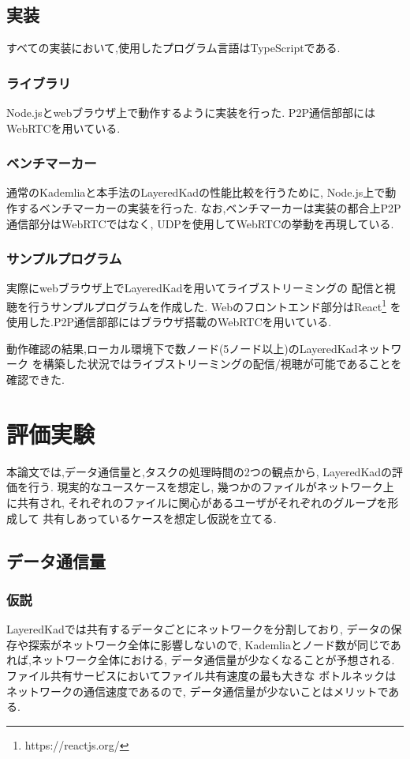 \documentclass[sotsuron]{jcsie}
\begin{document}
\section{実装}
すべての実装において,使用したプログラム言語はTypeScriptである.

\subsection{ライブラリ}
Node.jsとwebブラウザ上で動作するように実装を行った.
P2P通信部部にはWebRTCを用いている.

\subsection{ベンチマーカー}
通常のKademliaと本手法のLayeredKadの性能比較を行うために,
Node.js上で動作するベンチマーカーの実装を行った.
なお,ベンチマーカーは実装の都合上P2P通信部分はWebRTCではなく,
UDPを使用してWebRTCの挙動を再現している.

\subsection{サンプルプログラム}
実際にwebブラウザ上でLayeredKadを用いてライブストリーミングの
配信と視聴を行うサンプルプログラムを作成した.
Webのフロントエンド部分はReact\footnote{https://reactjs.org/}
を使用した.P2P通信部部にはブラウザ搭載のWebRTCを用いている.

動作確認の結果,ローカル環境下で数ノード(5ノード以上)のLayeredKadネットワーク
を構築した状況ではライブストリーミングの配信/視聴が可能であることを
確認できた.

\chapter{評価実験}
本論文では,データ通信量と,タスクの処理時間の2つの観点から,
LayeredKadの評価を行う.
現実的なユースケースを想定し,
幾つかのファイルがネットワーク上に共有され,
それぞれのファイルに関心があるユーザがそれぞれのグループを形成して
共有しあっているケースを想定し仮説を立てる.

\section{データ通信量}
\subsection{仮説}
LayeredKadでは共有するデータごとにネットワークを分割しており,
データの保存や探索がネットワーク全体に影響しないので,
Kademliaとノード数が同じであれば,ネットワーク全体における,
データ通信量が少なくなることが予想される.
ファイル共有サービスにおいてファイル共有速度の最も大きな
ボトルネックはネットワークの通信速度であるので,
データ通信量が少ないことはメリットである.
\end{document}
